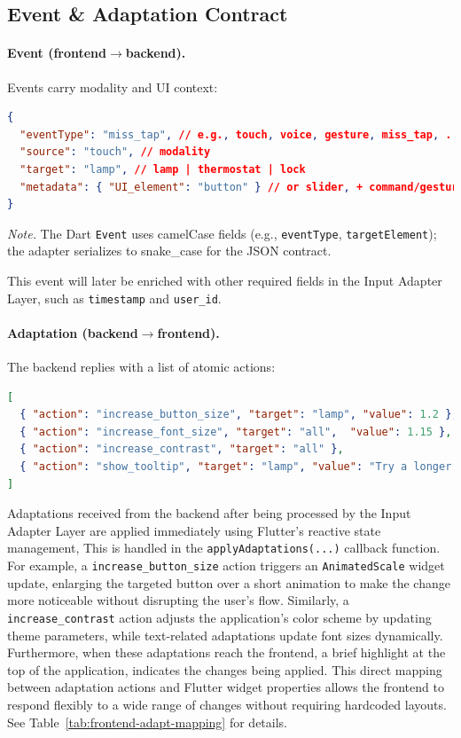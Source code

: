 \documentclass[openany]{book}
\begin{document}
\subsection{Event \& Adaptation Contract}
\label{sec:event_adaptation_contract}
\paragraph{Event (frontend$\rightarrow$backend).} Events carry modality and UI context:
\begin{lstlisting}[language=json, basicstyle=\ttfamily\small, caption={Event structure}]
{
  "eventType": "miss_tap", // e.g., touch, voice, gesture, miss_tap, ...
  "source": "touch", // modality
  "target": "lamp", // lamp | thermostat | lock
  "metadata": { "UI_element": "button" } // or slider, + command/gesture fields
}
\end{lstlisting}
\noindent\emph{Note.} The Dart \texttt{Event} uses camelCase fields (e.g., \texttt{eventType}, \texttt{targetElement}); the adapter serializes to snake\_case for the JSON contract.

This event will later be enriched with other required fields in the Input Adapter Layer, such as \texttt{timestamp} and \texttt{user\_id}.

\paragraph{Adaptation (backend$\rightarrow$frontend).} The backend replies with a list of atomic actions:
\begin{lstlisting}[language=json, basicstyle=\ttfamily\small, caption={Adaptation example actions}]
[
  { "action": "increase_button_size", "target": "lamp", "value": 1.2 },
  { "action": "increase_font_size", "target": "all",  "value": 1.15 },
  { "action": "increase_contrast", "target": "all" },
  { "action": "show_tooltip", "target": "lamp", "value": "Try a longer press" }
]
\end{lstlisting}

Adaptations received from the backend after being processed by the Input Adapter Layer are applied immediately using Flutter’s reactive state management, This is handled in the \verb|applyAdaptations(...)| callback function. For example, a \texttt{increase\_button\_size} action triggers an \texttt{AnimatedScale} widget update, enlarging the targeted button over a short animation to make the change more noticeable without disrupting the user’s flow. Similarly, a \texttt{increase\_contrast} action adjusts the application’s color scheme by updating theme parameters, while text-related adaptations update font sizes dynamically. Furthermore, when these adaptations reach the frontend, a brief highlight at the top of the application, indicates the changes being applied. This direct mapping between adaptation actions and Flutter widget properties allows the frontend to respond flexibly to a wide range of changes without requiring hardcoded layouts. See Table~\ref{tab:frontend-adapt-mapping} for details.
\end{document}
